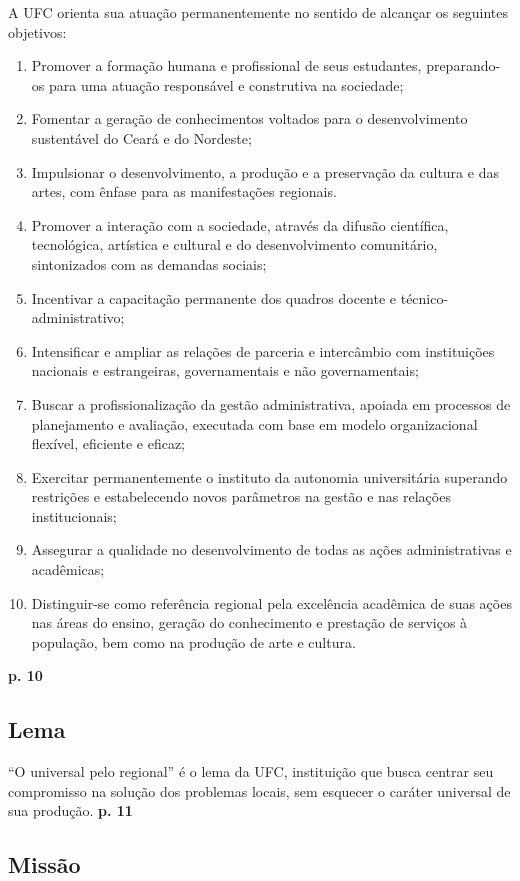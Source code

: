 \documentclass{report}
\begin{document}
A UFC orienta sua atuação permanentemente no sentido de alcançar os seguintes objetivos:
\begin{enumerate}
\item
Promover a formação humana e profissional de seus estudantes, preparando-os para uma atuação responsável e construtiva na sociedade;
\item
Fomentar a geração de conhecimentos voltados para o desenvolvimento sustentável do Ceará e do Nordeste;
\item
Impulsionar o desenvolvimento, a produção e a preservação da cultura e das artes, com ênfase para as manifestações regionais.
\item
Promover a interação com a sociedade, através da difusão científica, tecnológica, artística e cultural e do desenvolvimento comunitário, sintonizados com as demandas sociais;
\item
Incentivar a capacitação permanente dos quadros docente e técnico-administrativo;
\item
Intensificar e ampliar as relações de parceria e intercâmbio com instituições nacionais e estrangeiras, governamentais e não governamentais;
\item
Buscar a profissionalização da gestão administrativa, apoiada em processos de planejamento e avaliação, executada com base em modelo organizacional flexível, eficiente e eficaz;
\item
Exercitar permanentemente o instituto da autonomia universitária superando restrições e estabelecendo novos parâmetros na gestão e nas relações institucionais;
\item
Assegurar a qualidade no desenvolvimento de todas as ações administrativas e acadêmicas;
\item
Distinguir-se como referência regional pela excelência acadêmica de suas ações nas áreas do ensino, geração do conhecimento e prestação de serviços à população, bem como na produção de arte e cultura.
\end{enumerate}
\textbf{p. 10}

\subsection{Lema}

“O universal pelo regional” é o lema da UFC, instituição que busca centrar seu compromisso na solução dos problemas locais, sem esquecer o caráter universal de sua produção.
\textbf{p. 11}

\subsection{Missão}
\end{document}
